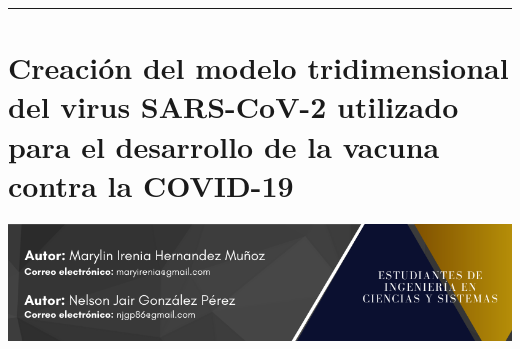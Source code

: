 \documentclass[12pt,spanish,Letterpaper,openany]{book}
\newcommand{\HRule}{\begin{center}\rule{0.5\linewidth}{0.2mm}\end{center}}
\begin{document}
\medskip

\HRule

\medskip

\hypertarget{pareja51}{%
\chapter{Creación del modelo tridimensional del virus SARS-CoV-2 utilizado para el desarrollo de la vacuna contra la COVID-19}\label{pareja51}}

\begin{center}\includegraphics[width=1\linewidth]{images/pareja51_04} \end{center}
\end{document}
